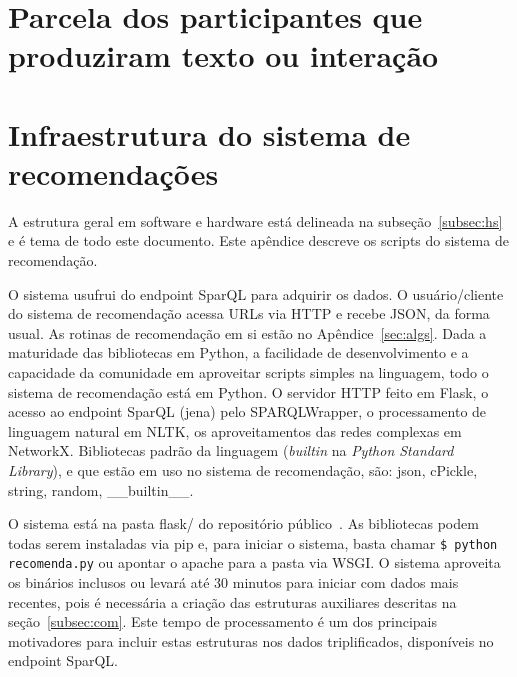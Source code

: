 \documentclass[12pt]{article}
\begin{document}
\section{Parcela dos participantes que produziram texto ou interação}

\section{Infraestrutura do sistema de recomendações}\label{sec:infra}
A estrutura geral em software e hardware está delineada na subseção~\ref{subsec:hs}
e é tema de todo este documento. Este apêndice descreve os scripts
do sistema de recomendação.

O sistema usufrui do endpoint SparQL para adquirir os dados. O usuário/cliente
do sistema de recomendação acessa URLs via HTTP e recebe JSON, da forma usual.
As rotinas de recomendação em si estão no Apêndice~\ref{sec:algs}. Dada a maturidade
das bibliotecas em Python, a facilidade de desenvolvimento e a capacidade
da comunidade em aproveitar scripts simples na linguagem, todo o sistema de recomendação
está em Python. O servidor HTTP feito em Flask, o acesso ao endpoint SparQL (jena) pelo
SPARQLWrapper, o processamento de linguagem natural em NLTK, os aproveitamentos
das redes complexas em NetworkX. Bibliotecas padrão da linguagem (\emph{builtin} na \emph{Python Standard Library}),
e que estão em uso no sistema de recomendação,
são: json, cPickle, string, random, \_\_builtin\_\_.

O sistema está na pasta flask/ do repositório público~\cite{repoProd4}.
As bibliotecas podem todas serem instaladas via pip e, para iniciar o sistema,
basta chamar \texttt{\$ python recomenda.py} ou apontar o apache para a pasta via WSGI.
O sistema aproveita os binários inclusos ou levará até 30 minutos para iniciar com dados mais recentes, pois é necessária a criação das estruturas auxiliares
descritas na seção~\ref{subsec:com}. Este tempo de processamento é um dos principais motivadores para incluir estas estruturas nos dados triplificados, disponíveis no endpoint SparQL.
\end{document}
